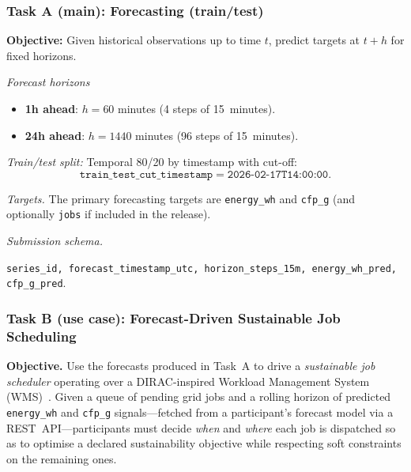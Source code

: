 
\subsubsection*{Task A (main): Forecasting (train/test)}

\textbf{Objective:} Given historical observations up to time $t$, predict
targets at $t+h$ for fixed horizons.

\noindent\textit{Forecast horizons}
\begin{itemize}
  \item \textbf{1h ahead}: $h = 60$ minutes (4 steps of 15~minutes).
  \item \textbf{24h ahead}: $h = 1440$ minutes (96 steps of 15~minutes).
\end{itemize}

\noindent\textit{Train/test split:} Temporal 80/20 by timestamp with cut-off:
\[
  \texttt{train\_test\_cut\_timestamp} = \texttt{2026-02-17T14:00:00}.
\]

\noindent\textit{Targets.} The primary forecasting targets are
\texttt{energy\_wh} and \texttt{cfp\_g} (and optionally \texttt{jobs} if
included in the release).

\noindent\textit{Submission schema.}
\begin{center}
  \texttt{series\_id,\ forecast\_timestamp\_utc,\ horizon\_steps\_15m,\
          energy\_wh\_pred,\ cfp\_g\_pred}.
\end{center}

\subsubsection*{Task B (use case): Forecast-Driven Sustainable Job Scheduling}

\textbf{Objective.}
Use the forecasts produced in Task~A to drive a \emph{sustainable job
scheduler} operating over a DIRAC-inspired Workload Management System
(WMS)~\cite{Tsaregorodtsev2010}.
Given a queue of pending grid jobs and a rolling horizon of predicted
\texttt{energy\_wh} and \texttt{cfp\_g} signals—fetched from a participant's
forecast model via a REST~API—participants must decide \emph{when} and
\emph{where} each job is dispatched so as to optimise a declared sustainability
objective while respecting soft constraints on the remaining ones.

